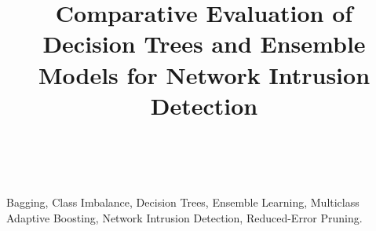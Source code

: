 \documentclass[10pt]{IEEEtran}
\begin{document}
\title{Comparative Evaluation of Decision Trees and Ensemble Models for Network Intrusion Detection}

\author{ \\
}

\maketitle



\begin{IEEEkeywords}
Bagging, Class Imbalance, Decision Trees, Ensemble Learning, Multiclass Adaptive Boosting, Network Intrusion Detection, Reduced-Error Pruning.
\end{IEEEkeywords}












\end{document}

